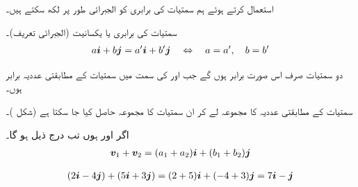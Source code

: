  استعمال کرتے ہوئے ہم سمتیات کی برابری کو الجبرائی طور پر لکھ سکتے ہیں۔

سمتیات کی برابری یا یکسانیت (الجبرائی تعریف)۔
\begin{align}
a{\boldsymbol{i}}+b{\boldsymbol{j}}=a'{\boldsymbol{i}}+b'{\boldsymbol{j}}\quad \Leftrightarrow\quad a=a',\quad b=b'
\end{align}

دو سمتیات صرف اس صورت  برابر ہوں گے جب  اور  کی سمت میں سمتیات کے مطابقتی عددیہ  برابر ہوں۔

سمتیات کے مطابقتی عددیہ   کا مجموعہ لے کر ان سمتیات  کا مجموعہ حاصل کیا جا سکتا ہے (شکل )۔

اگر  اور  ہوں تب درج ذیل ہو گا۔ 
\begin{align*}
{\ensuremath{{\boldsymbol{v}}}}_1+{{\boldsymbol{v}}}_2=(a_1+a_2){\boldsymbol{i}}+(b_1+b_2){\boldsymbol{j}}
\end{align*}

\begin{align*}
(2{\boldsymbol{i}}-4{\boldsymbol{j}})+(5{\boldsymbol{i}}+3{\boldsymbol{j}})=(2+5){\boldsymbol{i}}+(-4+3){\boldsymbol{j}}=7{\boldsymbol{i}}-{\boldsymbol{j}}
\end{align*}

